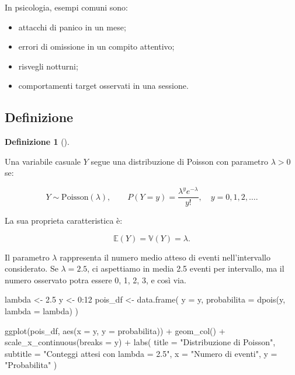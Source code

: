 \documentclass[
  italian,
  letterpaper,
  a4paper,
  11pt,
  open=any]{scrbook}
\newenvironment{Shaded}{\begin{snugshade}}{\end{snugshade}}
\newcommand{\AttributeTok}[1]{\textcolor[rgb]{0.40,0.45,0.13}{#1}}
\newcommand{\DecValTok}[1]{\textcolor[rgb]{0.68,0.00,0.00}{#1}}
\newcommand{\FloatTok}[1]{\textcolor[rgb]{0.68,0.00,0.00}{#1}}
\newcommand{\FunctionTok}[1]{\textcolor[rgb]{0.28,0.35,0.67}{#1}}
\newcommand{\NormalTok}[1]{\textcolor[rgb]{0.00,0.23,0.31}{#1}}
\newcommand{\OtherTok}[1]{\textcolor[rgb]{0.00,0.23,0.31}{#1}}
\newcommand{\SpecialCharTok}[1]{\textcolor[rgb]{0.37,0.37,0.37}{#1}}
\newcommand{\StringTok}[1]{\textcolor[rgb]{0.13,0.47,0.30}{#1}}
\providecommand{\tightlist}{%
  \setlength{\itemsep}{0pt}\setlength{\parskip}{0pt}}
\theoremstyle{plain}
\theoremstyle{definition}
\theoremstyle{definition}
\newtheorem{definition}{Definizione}[chapter]
\theoremstyle{remark}
\begin{document}
In psicologia, esempi comuni sono:

\begin{itemize}
\tightlist
\item
  attacchi di panico in un mese;
\item
  errori di omissione in un compito attentivo;
\item
  risvegli notturni;
\item
  comportamenti target osservati in una sessione.
\end{itemize}

\subsection{Definizione}\label{definizione-3}

\begin{definition}[]\protect\hypertarget{def-poisson}{}\label{def-poisson}

Una variabile casuale \(Y\) segue una distribuzione di Poisson con
parametro \(\lambda > 0\) se:

\[
Y \sim \mathrm{Poisson}(\lambda),
\qquad
P(Y=y)=\frac{\lambda^y e^{-\lambda}}{y!},
\quad y=0,1,2,\ldots.
\]

La sua proprieta caratteristica è:

\[
\mathbb{E}(Y)=\mathbb{V}(Y)=\lambda.
\]

\end{definition}

Il parametro \(\lambda\) rappresenta il numero medio atteso di eventi
nell'intervallo considerato. Se \(\lambda=2.5\), ci aspettiamo in media
2.5 eventi per intervallo, ma il numero osservato potra essere 0, 1, 2,
3, e così via.

\begin{Shaded}
\begin{Highlighting}[]
\NormalTok{lambda }\OtherTok{\textless{}{-}} \FloatTok{2.5}
\NormalTok{y }\OtherTok{\textless{}{-}} \DecValTok{0}\SpecialCharTok{:}\DecValTok{12}
\NormalTok{pois\_df }\OtherTok{\textless{}{-}} \FunctionTok{data.frame}\NormalTok{(}
  \AttributeTok{y =}\NormalTok{ y,}
  \AttributeTok{probabilita =} \FunctionTok{dpois}\NormalTok{(y, }\AttributeTok{lambda =}\NormalTok{ lambda)}
\NormalTok{)}

\FunctionTok{ggplot}\NormalTok{(pois\_df, }\FunctionTok{aes}\NormalTok{(}\AttributeTok{x =}\NormalTok{ y, }\AttributeTok{y =}\NormalTok{ probabilita)) }\SpecialCharTok{+}
  \FunctionTok{geom\_col}\NormalTok{() }\SpecialCharTok{+}
  \FunctionTok{scale\_x\_continuous}\NormalTok{(}\AttributeTok{breaks =}\NormalTok{ y) }\SpecialCharTok{+}
  \FunctionTok{labs}\NormalTok{(}
    \AttributeTok{title =} \StringTok{"Distribuzione di Poisson"}\NormalTok{,}
    \AttributeTok{subtitle =} \StringTok{"Conteggi attesi con lambda = 2.5"}\NormalTok{,}
    \AttributeTok{x =} \StringTok{"Numero di eventi"}\NormalTok{,}
    \AttributeTok{y =} \StringTok{"Probabilita"}
\NormalTok{  )}
\end{Highlighting}
\end{Shaded}
\end{document}
